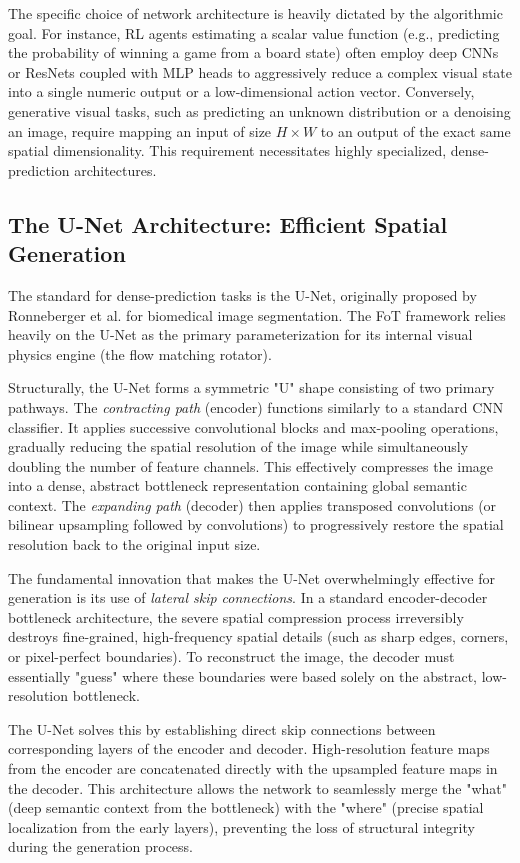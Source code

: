 \documentclass{l4proj}
\begin{document}
The specific choice of network architecture is heavily dictated by the algorithmic goal. For instance, RL agents estimating a scalar value function (e.g., predicting the probability of winning a game from a board state) often employ deep CNNs or ResNets coupled with MLP heads to aggressively reduce a complex visual state into a single numeric output or a low-dimensional action vector. Conversely, generative visual tasks, such as predicting an unknown distribution or a denoising an image, require mapping an input of size $H \times W$ to an output of the exact same spatial dimensionality. This requirement necessitates highly specialized, dense-prediction architectures.

\subsection{The U-Net Architecture: Efficient Spatial Generation}
The standard for dense-prediction tasks is the U-Net, originally proposed by Ronneberger et al. \citep{ronneberger2015u} for biomedical image segmentation. The FoT framework relies heavily on the U-Net as the primary parameterization for its internal visual physics engine (the flow matching rotator).

Structurally, the U-Net forms a symmetric "U" shape consisting of two primary pathways. The \textit{contracting path} (encoder) functions similarly to a standard CNN classifier. It applies successive convolutional blocks and max-pooling operations, gradually reducing the spatial resolution of the image while simultaneously doubling the number of feature channels. This effectively compresses the image into a dense, abstract bottleneck representation containing global semantic context. The \textit{expanding path} (decoder) then applies transposed convolutions (or bilinear upsampling followed by convolutions) to progressively restore the spatial resolution back to the original input size.

The fundamental innovation that makes the U-Net overwhelmingly effective for generation is its use of \textit{lateral skip connections}. In a standard encoder-decoder bottleneck architecture, the severe spatial compression process irreversibly destroys fine-grained, high-frequency spatial details (such as sharp edges, corners, or pixel-perfect boundaries). To reconstruct the image, the decoder must essentially "guess" where these boundaries were based solely on the abstract, low-resolution bottleneck.

The U-Net solves this by establishing direct skip connections between corresponding layers of the encoder and decoder. High-resolution feature maps from the encoder are concatenated directly with the upsampled feature maps in the decoder. This architecture allows the network to seamlessly merge the "what" (deep semantic context from the bottleneck) with the "where" (precise spatial localization from the early layers), preventing the loss of structural integrity during the generation process.
\end{document}
